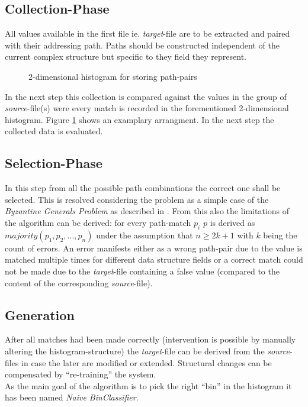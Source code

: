 \documentclass[conference]{IEEEtran}
\begin{document}
\subsection{Collection-Phase}
All values available in the first file ie. \textit{target}-file are to be extracted and
paired with their addressing path. Paths should be constructed independent of the current
complex structure but specific to they field they represent.
\begin{figure}[h]
  \centering
 \caption{2-dimensional histogram for storing path-pairs}
 \label{classifier_table}
\end{figure}
In the next step this collection is compared against the values in the group of
\textit{source}-file(s) were every match is recorded in the forementioned 2-dimensional histogram.
Figure \ref{classifier_table} shows an examplary arrangment. In the next step the collected data
is evaluated.

\subsection{Selection-Phase}
In this step from all the possible path combinations the correct one shall be selected. This is
resolved considering the problem as a simple case of the \textit{Byzantine Generals Problem} as
described in \cite{lamport:byzantine}. From this also the limitations of the algorithm can be derived:
for every path-match $p_i$ $p$ is derived as $majority(p_1, p_2, ...,p_n)$ under the assumption that
$n \geq 2k + 1$ with $k$ being the count of errors. An error manifests either as a wrong path-pair due
to the value is matched multiple times for different data structure fields or a correct match could
not be made due to the \textit{target}-file containing a false value (compared to the content of the
corresponding \textit{source}-file).

\subsection{Generation}
After all matches had been made correctly (intervention is possible by manually altering the
histogram-structure) the \textit{target}-file can be derived from the \textit{source}-files in
case the later are modified or extended. Structural changes can be compensated by ``re-training''
the system.\\As the main goal of the algorithm is to pick the right ``bin'' in the histogram it
has been named \textit{Naive BinClassifier}.
\end{document}
